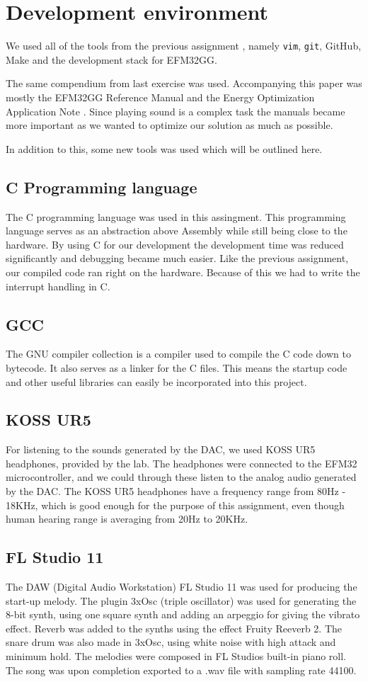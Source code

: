 \section{Development environment}
We used all of the tools from the previous assignment \cite{report-1}, namely \texttt{vim}, \texttt{git}, GitHub, Make and the development stack for EFM32GG.

The same compendium \cite{eeds-compendium} from last exercise was used.
Accompanying this paper was mostly the EFM32GG Reference Manual \cite{efm32gg-ref-man} and the Energy Optimization Application Note \cite{efm32gg-energy-op}.
Since playing sound is a complex task the manuals became more important as we wanted to optimize our solution as much as possible.

In addition to this, some new tools was used which will be outlined here.

\subsection{C Programming language}
The C programming language was used in this assingment.
This programming language serves as an abstraction above Assembly while still being close to the hardware.
By using C for our development the development time was reduced significantly and debugging became much easier.
Like the previous assignment, our compiled code ran right on the hardware.
Because of this we had to write the interrupt handling in C.

\subsection{GCC}
The GNU compiler collection is a compiler used to compile the C code down to bytecode.
It also serves as a linker for the C files. This means the startup code and other useful libraries can easily be incorporated into this project.

\subsection{KOSS UR5}
For listening to the sounds generated by the DAC, we used KOSS UR5 headphones, provided by the lab.
The headphones were connected to the EFM32 microcontroller, and we could through these listen to the analog audio generated by the DAC.
The KOSS UR5 headphones have a frequency range from 80Hz - 18KHz, which is good enough for the purpose of this assignment, even though human hearing range is averaging from 20Hz to 20KHz.

\subsection{FL Studio 11}
The DAW (Digital Audio Workstation) FL Studio 11 was used for producing the start-up melody. The plugin 3xOsc (triple oscillator) was used for generating the 8-bit synth, using one square synth and adding an arpeggio for giving the vibrato effect. Reverb was added to the synths using the effect Fruity Reeverb 2. The snare drum was also made in 3xOsc, using white noise with high attack and minimum hold. The melodies were composed in FL Studios built-in piano roll. The song was upon completion exported to a .wav file with sampling rate 44100.

